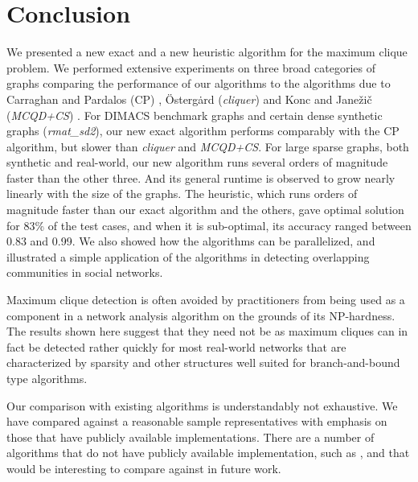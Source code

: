\section{Conclusion}
\label{sec:conclusion}

We presented a new exact and a new heuristic algorithm for the maximum clique problem.
We performed extensive experiments on three broad categories of graphs comparing the 
performance of our algorithms to the algorithms due to
Carraghan and Pardalos (CP) \cite{pardalos},
\"{O}sterg\.{a}rd ({\it cliquer}) \cite{ostergard} and
Konc and Jane\v{z}i\v{c} ({\it MCQD+CS}) \cite{konc2007improved}.
For DIMACS benchmark graphs and certain dense synthetic graphs ({\it rmat\_sd2}), our new exact algorithm performs comparably with the CP algorithm, but slower than {\it cliquer}
and {\it MCQD+CS}. 
For large sparse graphs, both synthetic and real-world, our new algorithm runs
several orders of magnitude faster than the other three. 
And its general runtime is observed to grow nearly linearly with the size of the graphs. 
The heuristic, which runs orders of magnitude faster than our exact algorithm and the others, gave optimal solution for 83\% of the test cases, and when it is sub-optimal, its accuracy ranged between 0.83 and 0.99.
We also showed how the algorithms can be parallelized, and illustrated a simple application of the algorithms in detecting overlapping communities in social networks. 

Maximum clique detection is often avoided by practitioners from being used as a component in 
a network analysis algorithm on the grounds of its NP-hardness. The results shown here suggest that they need
not be as maximum cliques can in fact be detected rather quickly for most real-world networks that are characterized by sparsity and other structures well suited for branch-and-bound type algorithms.

Our comparison with existing algorithms is understandably not exhaustive.
We have compared against a reasonable sample representatives with emphasis on those
that have publicly available implementations. There are a number of algorithms that do not have publicly available implementation, such as \cite{walcom,AAAI101611}, and that would be interesting to compare against in future work. 
